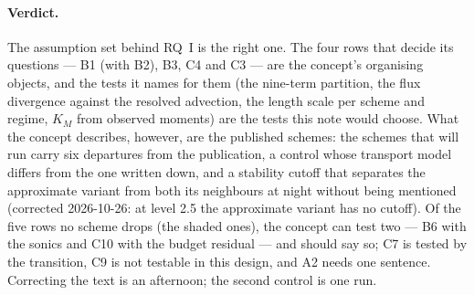 \paragraph{Verdict.}
The assumption set behind RQ~I is the right one. The four rows that decide its questions --- B1
(with B2), B3, C4 and C3 --- are the concept's organising objects, and the tests it names for them
(the nine-term partition, the flux divergence against the resolved advection, the length scale
per scheme and regime, $K_M$ from observed moments) are the tests this note would choose. What the
concept describes, however, are the published schemes: the schemes that will run carry six
departures from the publication, a control whose transport model differs from the one written
down, and a stability cutoff that separates the approximate variant from both its neighbours at
night without being mentioned (corrected 2026-10-26: at level 2.5 the approximate variant has no cutoff). Of the five rows no scheme drops (the shaded ones), the concept
can test two --- B6 with the sonics and C10 with the budget residual --- and should say so; C7 is
tested by the transition, C9 is not testable in this design, and A2 needs one sentence. Correcting
the text is an afternoon; the second control is one run.
